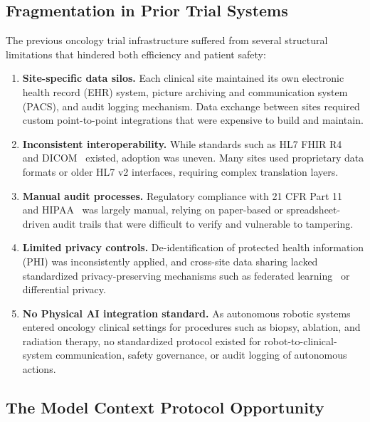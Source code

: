 \documentclass{article}
\begin{document}
\subsection{Fragmentation in Prior Trial Systems}

The previous oncology trial infrastructure suffered from several structural limitations that hindered both efficiency and patient safety:

\begin{enumerate}[leftmargin=*]
\item \textbf{Site-specific data silos.} Each clinical site maintained its own electronic health record (EHR) system, picture archiving and communication system (PACS), and audit logging mechanism. Data exchange between sites required custom point-to-point integrations that were expensive to build and maintain.

\item \textbf{Inconsistent interoperability.} While standards such as HL7 FHIR R4~\cite{fhir2019r4} and DICOM~\cite{dicom2024standard} existed, adoption was uneven. Many sites used proprietary data formats or older HL7 v2 interfaces, requiring complex translation layers.

\item \textbf{Manual audit processes.} Regulatory compliance with 21 CFR Part 11~\cite{fda2003part11} and HIPAA~\cite{hipaa1996} was largely manual, relying on paper-based or spreadsheet-driven audit trails that were difficult to verify and vulnerable to tampering.

\item \textbf{Limited privacy controls.} De-identification of protected health information (PHI) was inconsistently applied, and cross-site data sharing lacked standardized privacy-preserving mechanisms such as federated learning~\cite{mcmahan2017fedavg} or differential privacy.

\item \textbf{No Physical AI integration standard.} As autonomous robotic systems entered oncology clinical settings for procedures such as biopsy, ablation, and radiation therapy, no standardized protocol existed for robot-to-clinical-system communication, safety governance, or audit logging of autonomous actions.
\end{enumerate}

\subsection{The Model Context Protocol Opportunity}
\end{document}
